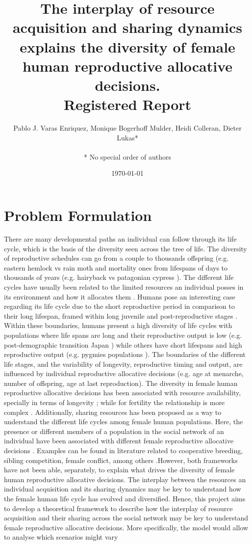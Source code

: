 \documentclass{article}
\title{The interplay of resource acquisition and sharing dynamics explains the diversity of female human reproductive allocative decisions.
\\
Registered Report}
\author{Pablo J. Varas Enriquez, Monique Bogerhoff Mulder, Heidi Colleran, Dieter Lukas*\\\\
* No special order of authors}
\date{\today}
\begin{document}
\maketitle

\tableofcontents

\section{Problem Formulation}

There are many developmental paths an individual can follow through its life cycle, which is the basis of the diversity seen across the tree of life. The diversity of reproductive schedules can go from a couple to thousands offspring (e.g. eastern hemlock vs rain moth \citep{tindale1932revision,van2017lifetime} and mortality ones from lifespans of days to thousands of years (e.g. hairyback vs patagonian cypress \citep{balsamo1988life,lara19933620}). The different life cycles have usually been related to the limited resources an individual posses in its environment and how it allocates them \citep{stearns2000life}. Humans pose an interesting case regarding its life cycle due to the short reproductive period in comparison to their long lifespan, framed within long juvenile and post-reproductive stages \citep{kaplan2000theory}. Within these boundaries, humans present a high diversity of life cycles with populations where life spans are long and their reproductive output is low (e.g. post-demographic transition Japan \citep{de2017maximum}) while others have short lifespans and high reproductive output (e.g. pygmies populations \citep{migliano2007life}).  The boundaries of the different life stages, and the variability of longevity, reproductive timing and output, are influenced by individual reproductive allocative decisions (e.g. age at menarche, number of offspring, age at last reproduction). The diversity in female human reproductive allocative decisions has been associated with resource availability, specially in terms of longevity \citep{kaplan2003embodied}; while for fertility the relationship is more complex \citep{mulder1998demographic,sear2016understanding}. Additionally, sharing resources has been proposed as a way to understand the different life cycles among female human populations. Here, the presence or different members of a population in the social network of an individual have been associated with different female reproductive allocative decisions \citep{sear2011much}. Examples can be found in literature related to cooperative breeding, sibling competition, female conflict, among others \citep{ivey2000cooperative,nitsch2013elder,mace2012female}.However, both frameworks have not been able, separately, to explain what drives the diversity of female human reproductive allocative decisions. The interplay between the resources an individual acquisition and its sharing dynamics may be key to understand how the female human life cycle has evolved and diversified. Hence,  this project aims to develop a theoretical framework to describe how the interplay of resource acquisition and their sharing across the social network may be key to understand female reproductive allocative decisions. More specifically, the model would allow to analyse which scenarios might vary 
\end{document}
